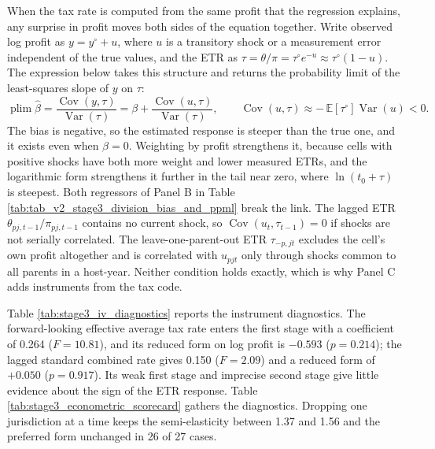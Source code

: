 \documentclass[11pt,a4paper]{article}
\begin{document}
When the tax rate is computed from the same profit that the regression explains, any surprise in profit moves both sides of the equation together. Write observed log profit as $y=y^{\circ}+u$, where $u$ is a transitory shock or a measurement error independent of the true values, and the ETR as $\tau=\theta/\pi=\tau^{\circ}e^{-u}\approx\tau^{\circ}(1-u)$. The expression below takes this structure and returns the probability limit of the least-squares slope of $y$ on $\tau$:
\begin{equation}\label{eq:app_division_bias}
\operatorname*{plim}\hat\beta=\frac{\operatorname{Cov}(y,\tau)}{\operatorname{Var}(\tau)}
=\beta+\frac{\operatorname{Cov}(u,\tau)}{\operatorname{Var}(\tau)},\qquad
\operatorname{Cov}(u,\tau)\approx-\,\mathbb{E}[\tau^{\circ}]\operatorname{Var}(u)<0.
\end{equation}
The bias is negative, so the estimated response is steeper than the true one, and it exists even when $\beta=0$. Weighting by profit strengthens it, because cells with positive shocks have both more weight and lower measured ETRs, and the logarithmic form strengthens it further in the tail near zero, where $\ln(t_0+\tau)$ is steepest. Both regressors of Panel B in Table \ref{tab:tab_v2_stage3_division_bias_and_ppml} break the link. The lagged ETR $\theta_{pj,t-1}/\pi_{pj,t-1}$ contains no current shock, so $\operatorname{Cov}(u_t,\tau_{t-1})=0$ if shocks are not serially correlated. The leave-one-parent-out ETR $\tau_{-p,jt}$ excludes the cell's own profit altogether and is correlated with $u_{pjt}$ only through shocks common to all parents in a host-year. Neither condition holds exactly, which is why Panel C adds instruments from the tax code.




Table \ref{tab:stage3_iv_diagnostics} reports the instrument diagnostics. The forward-looking effective average tax rate enters the first stage with a coefficient of 0.264 ($F=10.81$), and its reduced form on log profit is $-0.593$ ($p=0.214$); the lagged standard combined rate gives 0.150 ($F=2.09$) and a reduced form of $+0.050$ ($p=0.917$). Its weak first stage and imprecise second stage give little evidence about the sign of the ETR response. Table \ref{tab:stage3_econometric_scorecard} gathers the diagnostics. Dropping one jurisdiction at a time keeps the semi-elasticity between 1.37 and 1.56 and the preferred form unchanged in 26 of 27 cases.
\end{document}
